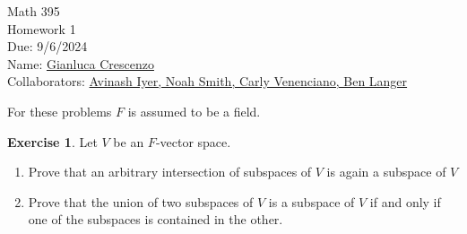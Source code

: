 \documentclass[10pt,twoside,openany]{memoir}
\theoremstyle{plain}
\theoremstyle{definition}
\newtheorem{exercise}{Exercise}
\theoremstyle{remark}
\numberwithin{equation}{section}
\begin{document}
\begin{center}
    { \Large Math 395 \\[0.1in]Homework 1 \\[0.1in]
    Due: 9/6/2024}\\[.25in]
    { Name:} {\underline{Gianluca Crescenzo\hspace*{2in}}}\\[0.15in]
    { Collaborators:} {\underline{ Avinash Iyer, Noah Smith, Carly Venenciano, Ben Langer \hspace*{1in}}} \\
    \end{center}
    For these problems $F$ is assumed to be a field.
    \vspace{4pt}
    
    \begin{comment}
    \begin{exercise}
        Define
            \begin{equation*}
            \begin{split}
                \mathfrak{sl}_n(\bfQ) = \{X = (x_{i,j}) \in \Mat_n{(\bfQ)} \mid \Tr{X} = \sum_{i=1}^n x_{i,i} = 0 \}.
            \end{split}
            \end{equation*}
        Show that $\mathfrak{sl}_n(\bfQ)$ is a $\bfQ$-vector space.
    \end{exercise}
    \end{comment}
    \begin{comment}
    \begin{exercise}
            Consider the vector space $F^3$. Determine and justify your answer, whether each of the following are subspaces of $F^3$:
    \end{exercise}
    \end{comment}
    \addtocounter{exercise}{2}
    \begin{exercise}
        Let $V$ be an $F$-vector space.
        \begin{enumerate}[label = (\alph*)]
            \item Prove that an arbitrary intersection of subspaces of $V$ is again a subspace of $V$
            \item Prove that the union of two subspaces of $V$ is a subspace of $V$ if and only if one of the subspaces is contained in the other.
        \end{enumerate}
    \end{exercise}
\end{document}
